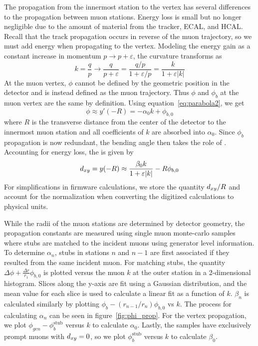 The propagation from the innermost station to the vertex has several differences to the propagation between muon stations. Energy loss is small but no longer negligible due to the amount of material from the tracker, ECAL, and HCAL. Recall that the track propagation occurs in reverse of the muon trajectory, so we must add energy when propagating to the vertex. Modeling the energy gain as a constant increase in momentum $p\to p+\varepsilon$, the curvature transforms as
\begin{equation}
	\label{eq:energygain}
	k=\frac{q}{p}\to\frac{q}{p+\varepsilon}=\frac{q/p}{1+\varepsilon/p}=\frac{k}{1+\varepsilon|k|}
\end{equation}
At the muon vertex, $\phi$ cannot be defined by the geometric position in the detector and is instead defined as the muon trajectory. Thus $\phi$ and $\phi_b$ at the muon vertex are the same by definition. Using equation~\ref{eq:parabola2}, we get
\begin{equation}
	\label{eq:vertex_phi}
	\phi\approx y'(-R)=-\alpha_0k+\phi_{b,0}
\end{equation}
where $R$ is the transverse distance from the center of the detector to the innermost muon station and all coefficients of $k$ are absorbed into $\alpha_0$. Since $\phi_b$ propagation is now redundant, the bending angle then takes the role of \dxy. Accounting for energy loss, the \dxy is given by
\begin{equation}
	\label{eq:vertex_dxy}
	d_{xy}=y(-R)\approx \frac{\beta_0k}{1+\varepsilon|k|}-R\phi_{b,0}
\end{equation}
For simplifications in firmware calculations, we store the quantity $d_{xy}/R$ and account for the normalization when converting the digitized calculations to physical units.

While the radii of the muon stations are determined by detector geometry, the propagation constants  are measured using single muon monte-carlo samples where stubs are matched to the incident muons using generator level information. To determine $\alpha_n$, stubs in stations $n$ and $n-1$ are first associated if they resulted from the same incident muon. For matching stubs, the quantity $\Delta\phi+\frac{\Delta r}{r_1}\phi_{b,0}$ is plotted versus the muon $k$ at the outer station in a 2-dimensional histogram. Slices along the y-axis are fit using a Gaussian distribution, and the mean value for each slice is used to calculate a linear fit as a function of $k$. $\beta_n$ is calculated similarly by plotting $\phi_b-\left(r_{n-1}/r_n\right)\phi_{b,0}$ vs $k$. The process for calculating $\alpha_n$ can be seen in figure~\ref{fig:phi_prop}. For the vertex propagation, we plot $\phi_{gen}-\phi_b^\text{stub}$ versus $k$ to calculate $\alpha_0$. Lastly, the samples have exclusively prompt muons with $d_{xy}=0$, so we plot $\phi_b^\text{stub}$ versus $k$ to calculate $\beta_0$.

